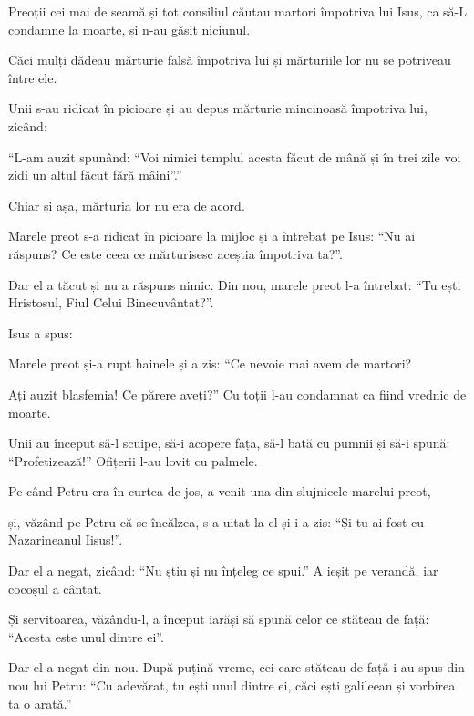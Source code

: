 {Preoții cei mai de seamă și tot consiliul căutau martori împotriva lui Isus, ca să-L condamne la moarte, și n-au găsit niciunul.

Căci mulți dădeau mărturie falsă împotriva lui și mărturiile lor nu se potriveau între ele.

Unii s-au ridicat în picioare și au depus mărturie mincinoasă împotriva lui, zicând:

“L-am auzit spunând: “Voi nimici templul acesta făcut de mână și în trei zile voi zidi un altul făcut fără mâini”.”

Chiar și așa, mărturia lor nu era de acord.


\par }{\PP {}Marele preot s-a ridicat în picioare la mijloc și a întrebat pe Isus: “Nu ai răspuns? Ce este ceea ce mărturisesc aceștia împotriva ta?”.

Dar el a tăcut și nu a răspuns nimic. Din nou, marele preot l-a întrebat: “Tu ești Hristosul, Fiul Celui Binecuvântat?”.


\par }{\PP {}Isus a spus:
{}


\par }{\PP {}Marele preot și-a rupt hainele și a zis: “Ce nevoie mai avem de martori?

Ați auzit blasfemia! Ce părere aveți?” Cu toții l-au condamnat ca fiind vrednic de moarte.

Unii au început să-l scuipe, să-i acopere fața, să-l bată cu pumnii și să-i spună: “Profetizează!” Ofițerii l-au lovit cu palmele.


\par }{\PP {}Pe când Petru era în curtea de jos, a venit una din slujnicele marelui preot,

și, văzând pe Petru că se încălzea, s-a uitat la el și i-a zis: “Și tu ai fost cu Nazarineanul Iisus!”.


\par }{\PP {}Dar el a negat, zicând: “Nu știu și nu înțeleg ce spui.” A ieșit pe verandă, iar cocoșul a cântat.


\par }{\PP {}Și servitoarea, văzându-l, a început iarăși să spună celor ce stăteau de față: “Acesta este unul dintre ei”.

Dar el a negat din nou. După puțină vreme, cei care stăteau de față i-au spus din nou lui Petru: “Cu adevărat, tu ești unul dintre ei, căci ești galileean și vorbirea ta o arată.”

}
